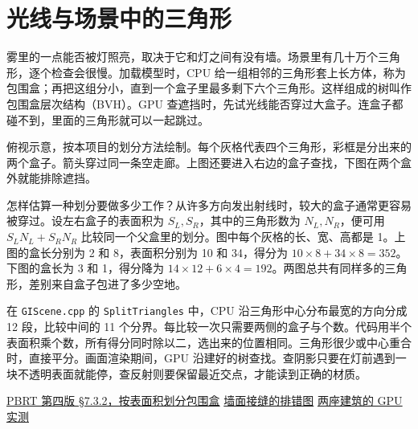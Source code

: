 \clearpage
\section{光线与场景中的三角形}
雾里的一点能否被灯照亮，取决于它和灯之间有没有墙。场景里有几十万个三角形，逐个检查会很慢。加载模型时，CPU 给一组相邻的三角形套上长方体，称为包围盒；再把这组分小，直到一个盒子里最多剩下六个三角形。这样组成的树叫作包围盒层次结构（BVH）。GPU 查遮挡时，先试光线能否穿过大盒子。连盒子都碰不到，里面的三角形就可以一起跳过。

\begin{center}
\end{center}
{\small\color{quiet}俯视示意，按本项目的划分方法绘制。每个灰格代表四个三角形，彩框是分出来的两个盒子。箭头穿过同一条空走廊。上图还要进入右边的盒子查找，下图在两个盒外就能排除遮挡。}\par

怎样估算一种划分要做多少工作？从许多方向发出射线时，较大的盒子通常更容易被穿过。设左右盒子的表面积为 $S_L,S_R$，其中的三角形数为 $N_L,N_R$，便可用 $S_LN_L+S_RN_R$ 比较同一个父盒里的划分。图中每个灰格的长、宽、高都是 1。上图的盒长分别为 2 和 8，表面积分别为 10 和 34，得分为 $10\times8+34\times8=352$。下图的盒长为 3 和 1，得分降为 $14\times12+6\times4=192$。两图总共有同样多的三角形，差别来自盒子包进了多少空地。

在 \texttt{GIScene.cpp} 的 \texttt{SplitTriangles} 中，CPU 沿三角形中心分布最宽的方向分成 12 段，比较中间的 11 个分界。每比较一次只需要两侧的盒子与个数。代码用半个表面积乘个数，所有得分同时除以二，选出来的位置相同。三角形很少或中心重合时，直接平分。画面渲染期间，GPU 沿建好的树查找。查阴影只要在灯前遇到一块不透明表面就能停，查反射则要保留最近交点，才能读到正确的材质。

{\small\color{quiet}\href{https://pbr-book.org/4ed/Primitives_and_Intersection_Acceleration/Bounding_Volume_Hierarchies}{PBRT 第四版 §7.3.2，按表面积划分包围盒}
\quad\href{run:Redflag-Debugging-Notes.pdf}{墙面接缝的排错图}
\quad\href{run:Redflag-Rendering-Performance.pdf}{两座建筑的 GPU 实测}}\par
